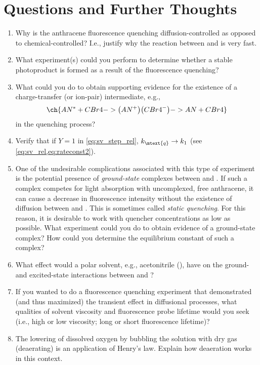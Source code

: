 \section{Questions and Further Thoughts} %
\label{sec:questions_and_further_thoughts}

\begin{enumerate}
	\item Why is the anthracene fluorescence quenching diffusion-controlled as opposed to chemical-controlled? 
	I.e., justify why the reaction between  and  is very fast.
	\item What experiment(s) could you perform to determine whether a stable photoproduct is formed as a result of the fluorescence quenching?
	\item What could you do to obtain supporting evidence for the existence of a charge-transfer (or ion-pair) intermediate, e.g.,
	\[
		\ch{AN^* + CBr4 -> \big(AN^+\big)\big(CBr4^-\big) -> AN + CBr4}
	\]
	in the quenching process?
	\item Verify that if \( Y = 1 \) in \cref{eq:sv_step_rel}, \( k_\mtext{q} \rightarrow k_1 \) (see \cref{eq:sv_rel,eq:rateconst2}).
	\item One of the undesirable complications associated with this type of experiment is the potential presence of \emph{ground-state} complexes between  and . 
	If such a complex competes for light absorption with uncomplexed, free anthracene, it can cause a decrease in fluorescence intensity without the existence of diffusion between  and . 
	This is sometimes called \emph{static quenching}. 
	For this reason, it is desirable to work with quencher concentrations as low as possible. 
	What experiment could you do to obtain evidence of a ground-state complex? 
	How could you determine the equilibrium constant of such a complex?
	\item What effect would a polar solvent, e.g., acetonitrile (), have on the ground- and excited-state interactions between  and ?
	\item If you wanted to do a fluorescence quenching experiment that demonstrated (and thus maximized) the transient effect in diffusional processes, what qualities of solvent viscosity and fluorescence probe lifetime would you seek (i.e., high or low viscosity; long or short fluorescence lifetime)?
	\item The lowering of dissolved oxygen by bubbling the solution with dry  gas (deaerating) is an application of Henry's law. 
	Explain how deaeration works in this context.
\end{enumerate}

